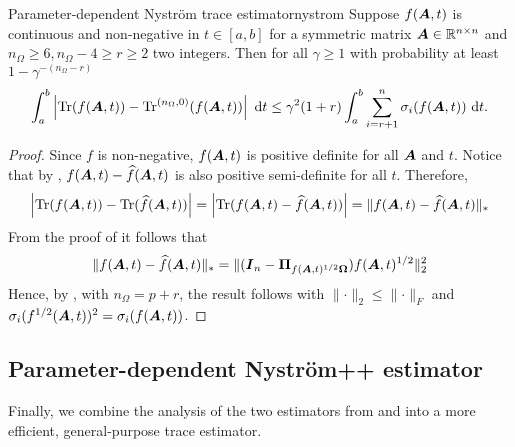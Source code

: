 \documentclass[12pt]{article}
\begin{document}
\begin{theorem}{Parameter-dependent Nyström trace estimator}{nystrom}
    Suppose $f(\boldsymbol{A}, t)$ is continuous and non-negative in $t \in [a, b]$ for a symmetric matrix $\boldsymbol{A} \in \mathbb{R}^{n \times n}$ and $n_{\Omega} \geq 6, n_{\Omega} - 4 \geq r \geq 2$ two integers. Then for all $\gamma \geq 1$ with probability at least $1 - \gamma^{-(n_{\Omega} - r)}$
    \begin{equation}
        \int_{a}^{b} \left| \operatorname{Tr}(f(\boldsymbol{A}, t)) - \operatorname{Tr}^{(n_{\Omega}, 0)}(f(\boldsymbol{A}, t)) \right| ~\mathrm{d}t
        \leq \gamma^2 (1 + r) \int_{a}^{b} \sum_{i = r+1}^{n} \sigma_i(f(\boldsymbol{A}, t)) ~\mathrm{d}t.
    \end{equation}
\end{theorem}

\begin{proof}
    Since $f$ is non-negative, $f(\boldsymbol{A}, t)$ is positive definite for all $\boldsymbol{A}$ and $t$.
    Notice that by \cite[Lemma 2.1]{frangella-2023-randomized-nystrom}, $f(\boldsymbol{A}, t) - \widehat{f}(\boldsymbol{A}, t)$ is also positive semi-definite for all $t$. Therefore,
    \begin{equation}
        \left| \operatorname{Tr}(f(\boldsymbol{A}, t)) - \operatorname{Tr}(\widehat{f}(\boldsymbol{A}, t)) \right|
        = \left| \operatorname{Tr}(f(\boldsymbol{A}, t) - \widehat{f}(\boldsymbol{A}, t)) \right|
        = \lVert f(\boldsymbol{A}, t) - \widehat{f}(\boldsymbol{A}, t) \rVert _{\ast}
    \end{equation}
    From the proof of \cite[Corollary 8.2]{tropp-2023-randomized-algorithms} it follows that
    \begin{equation}
        \lVert f(\boldsymbol{A}, t) - \widehat{f}(\boldsymbol{A}, t) \rVert _{\ast} = \lVert (\boldsymbol{I}_n - \boldsymbol{\Pi}_{f(\boldsymbol{A}, t)^{1/2} \boldsymbol{\Omega}}) f(\boldsymbol{A}, t)^{1/2} \rVert _2^2
    \end{equation}
    Hence, by \cite[Theorem 9]{kressner-2023-randomized-lowrank}, with $n_{\Omega} = p + r$, the result follows
    with $\lVert \cdot \rVert _2 \leq \lVert \cdot \rVert _F$ and $\sigma_i(f^{1/2}(\boldsymbol{A}, t))^{2} = \sigma_i(f(\boldsymbol{A}, t))$.
\end{proof}

\subsection{Parameter-dependent Nyström++ estimator}
\label{subsec:nystrom-pp}

Finally, we combine the analysis of the two estimators from  and  into a more efficient, general-purpose trace estimator.
\end{document}
